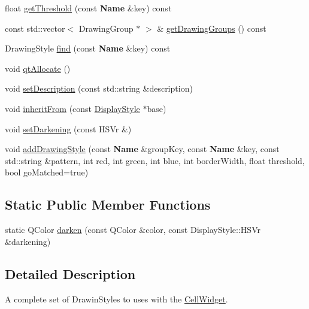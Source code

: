 \begin{DoxyCompactItemize}
\item 
float \mbox{\hyperlink{classHurricane_1_1DisplayStyle_ac4a7a7bfede6747aad9980fd7f375b8d}{get\+Threshold}} (const \textbf{ Name} \&key) const
\item 
const std\+::vector$<$ Drawing\+Group $\ast$ $>$ \& \mbox{\hyperlink{classHurricane_1_1DisplayStyle_ad85904fb9c823e5f0193461a5e4f9a1a}{get\+Drawing\+Groups}} () const
\item 
Drawing\+Style \mbox{\hyperlink{classHurricane_1_1DisplayStyle_ac7a76fdc5cf9e9a74840b9846bd390fc}{find}} (const \textbf{ Name} \&key) const
\item 
void \mbox{\hyperlink{classHurricane_1_1DisplayStyle_a9288b2780ffd5fccf94a41b597ed2efd}{qt\+Allocate}} ()
\item 
void \mbox{\hyperlink{classHurricane_1_1DisplayStyle_ae21071635857843536511f21da5533c7}{set\+Description}} (const std\+::string \&description)
\item 
void \mbox{\hyperlink{classHurricane_1_1DisplayStyle_a603dbd5d6973a8897a85513acdfda2d0}{inherit\+From}} (const \mbox{\hyperlink{classHurricane_1_1DisplayStyle}{Display\+Style}} $\ast$base)
\item 
void \mbox{\hyperlink{classHurricane_1_1DisplayStyle_ab17b746af2c529c62a902d0cb992be34}{set\+Darkening}} (const H\+S\+Vr \&)
\item 
void \mbox{\hyperlink{classHurricane_1_1DisplayStyle_aef2473891e0de472850f95cbd71b2cf4}{add\+Drawing\+Style}} (const \textbf{ Name} \&group\+Key, const \textbf{ Name} \&key, const std\+::string \&pattern, int red, int green, int blue, int border\+Width, float threshold, bool go\+Matched=true)
\end{DoxyCompactItemize}
\subsection*{Static Public Member Functions}
\begin{DoxyCompactItemize}
\item 
static Q\+Color \mbox{\hyperlink{classHurricane_1_1DisplayStyle_ab19987c4a2d971163749b7ab56b5597b}{darken}} (const Q\+Color \&color, const Display\+Style\+::\+H\+S\+Vr \&darkening)
\end{DoxyCompactItemize}


\subsection{Detailed Description}
A complete set of Drawin\+Styles to uses with the \mbox{\hyperlink{classHurricane_1_1CellWidget}{Cell\+Widget}}. 

